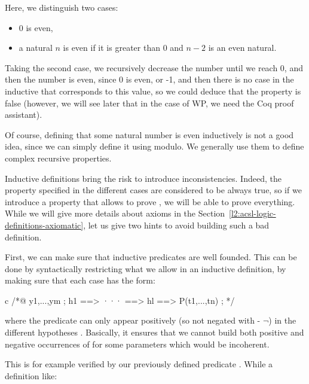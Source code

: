 


Here, we distinguish two cases:
\begin{itemize}
\item 0 is even,
\item a natural $n$ is even if it is greater than 0 and $n-2$ is an even
      natural.
\end{itemize}

Taking the second case, we recursively decrease the number until we reach
0, and then the number is even, since 0 is even, or -1, and then there
is no case in the inductive that corresponds to this value, so we could
deduce that the property is false (however, we will see later that in the
case of WP, we need the Coq proof assistant).





Of course, defining that some natural number is even inductively is not a
good idea, since we can simply define it using modulo. We generally use them
to define complex recursive properties.


Inductive definitions bring the risk to introduce inconsistencies. Indeed, the
property specified in the different cases are considered to be always true, so
if we introduce a property that allows to prove , we will be
able to prove everything. While we will give more details about axioms in the
Section~\ref{l2:acsl-logic-definitions-axiomatic}, let us give two hints to
avoid building such a bad definition.

First, we can make sure that inductive predicates are well founded. This can
be done by syntactically restricting what we allow in an inductive definition,
by making sure that each case has the form:

\begin{CodeBlock}{c}
/*@
  \forall y1,...,ym ; h1 ==> ··· ==> hl ==> P(t1,...,tn) ;
*/
\end{CodeBlock}

where the predicate  can only appear positively (so not negated
with \CodeInline{!} - $\neg$) in the different hypotheses .
Basically, it ensures that we cannot build both positive and negative
occurrences of  for some parameters which would be incoherent.

This is for example verified by our previously defined predicate
. While a definition like:

